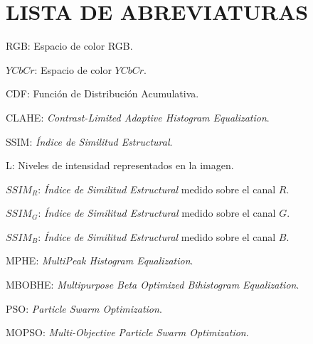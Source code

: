 \chapter*{LISTA DE ABREVIATURAS}
RGB: Espacio de color RGB.

$YCbCr$: Espacio de color $YCbCr$.

CDF: Función de Distribución Acumulativa.

CLAHE: \textit{Contrast-Limited Adaptive Histogram Equalization}.

SSIM: \textit{Índice de Similitud Estructural}.

L: Niveles de intensidad representados en la imagen.

$SSIM_R$: \textit{Índice de Similitud Estructural} medido sobre el canal $R$.

$SSIM_G$: \textit{Índice de Similitud Estructural} medido sobre el canal $G$.

$SSIM_B$: \textit{Índice de Similitud Estructural} medido sobre el canal $B$.

MPHE: \textit{MultiPeak Histogram Equalization}.

MBOBHE: \textit{Multipurpose Beta Optimized Bihistogram Equalization}.

PSO: \textit{Particle Swarm Optimization}.

MOPSO: \textit{Multi-Objective Particle Swarm Optimization}.

